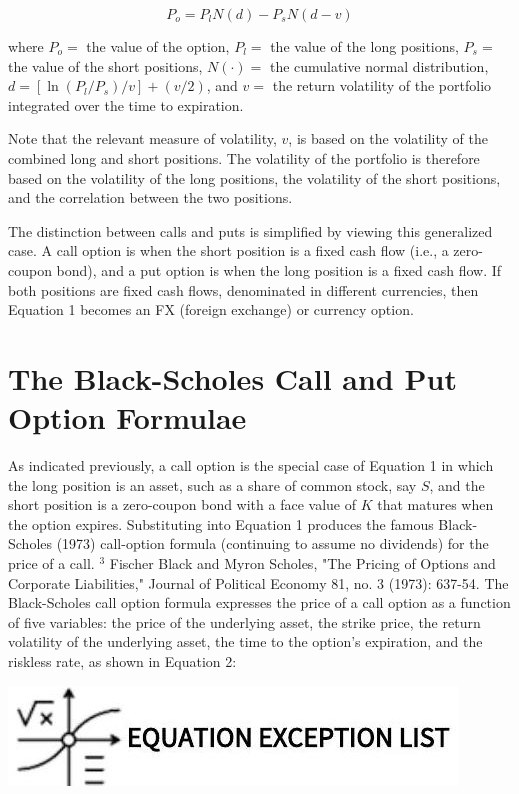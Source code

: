 \documentclass[11pt]{article}
\begin{document}
\begin{equation*}
P_{o}=P_{l} N(d)-P_{s} N(d-v) \tag{1}
\end{equation*}


where $P_{o}=$ the value of the option, $P_{l}=$ the value of the long positions, $P_{s}=$ the value of the short positions, $N(\cdot)=$ the cumulative normal distribution, $d=\left[\ln \left(P_{l} / P_{s}\right) / v\right]+(v / 2)$, and $v=$ the return volatility of the portfolio integrated over the time to expiration.

Note that the relevant measure of volatility, $v$, is based on the volatility of the combined long and short positions. The volatility of the portfolio is therefore based on the volatility of the long positions, the volatility of the short positions, and the correlation between the two positions.

The distinction between calls and puts is simplified by viewing this generalized case. A call option is when the short position is a fixed cash flow (i.e., a zero-coupon bond), and a put option is when the long position is a fixed cash flow. If both positions are fixed cash flows, denominated in different currencies, then Equation 1 becomes an FX (foreign exchange) or currency option.

\section*{The Black-Scholes Call and Put Option Formulae}
As indicated previously, a call option is the special case of Equation 1 in which the long position is an asset, such as a share of common stock, say $S$, and the short position is a zero-coupon bond with a face value of $K$ that matures when the option expires. Substituting into Equation 1 produces the famous Black-Scholes (1973) call-option formula (continuing to assume no dividends) for the price of a call. ${ }^{3}$ Fischer Black and Myron Scholes, "The Pricing of Options and Corporate Liabilities," Journal of Political Economy 81, no. 3 (1973): 637-54. The Black-Scholes call option formula expresses the price of a call option as a function of five variables: the price of the underlying asset, the strike price, the return volatility of the underlying asset, the time to the option's expiration, and the riskless rate, as shown in Equation 2:

\begin{center}
\includegraphics[max width=\textwidth]{2024_04_11_7c728ae44168a8fb26cag-2}
\end{center}
\end{document}
